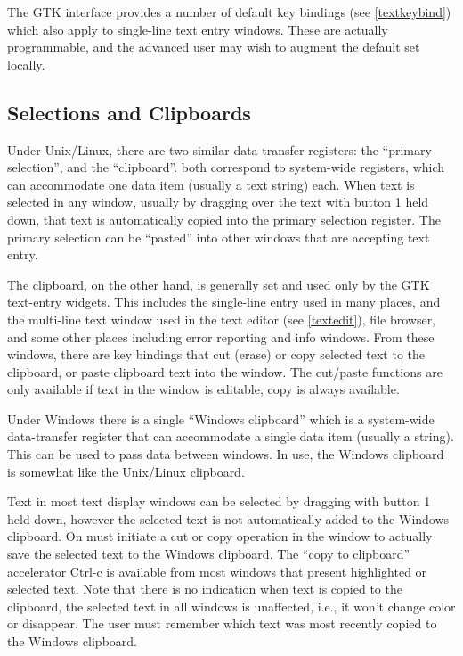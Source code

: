 The GTK interface provides a number of default key bindings (see
\ref{textkeybind}) which also apply to single-line text entry windows. 
These are actually programmable, and the advanced user may wish to
augment the default set locally.


\subsection{Selections and Clipboards}
\label{clipboard}
 
Under Unix/Linux, there are two similar data transfer registers:  the
``primary selection'', and the ``clipboard''.  both correspond to
system-wide registers, which can accommodate one data item (usually a
text string) each.  When text is selected in any window, usually by
dragging over the text with button 1 held down, that text is
automatically copied into the primary selection register.  The primary
selection can be ``pasted'' into other windows that are accepting text
entry.

The clipboard, on the other hand, is generally set and used only by
the GTK text-entry widgets.  This includes the single-line entry used
in many places, and the multi-line text window used in the text editor
(see \ref{textedit}), file browser, and some other places including
error reporting and info windows.  From these windows, there are key
bindings that cut (erase) or copy selected text to the clipboard, or
paste clipboard text into the window.  The cut/paste functions are
only available if text in the window is editable, copy is always
available.

Under Windows there is a single ``Windows clipboard'' which is a
system-wide data-transfer register that can accommodate a single data
item (usually a string).  This can be used to pass data between
windows.  In use, the Windows clipboard is somewhat like the
Unix/Linux clipboard.
 
Text in most text display windows can be selected by dragging with
button 1 held down, however the selected text is not automatically
added to the Windows clipboard.  On must initiate a {\cb cut} or {\cb
copy} operation in the window to actually save the selected text to
the Windows clipboard.  The ``copy to clipboard'' accelerator
{\kb Ctrl-c} is available from most windows that present highlighted
or selected text.  Note that there is no indication when text is
copied to the clipboard, the selected text in all windows is
unaffected, i.e., it won't change color or disappear.  The user must
remember which text was most recently copied to the Windows clipboard.

